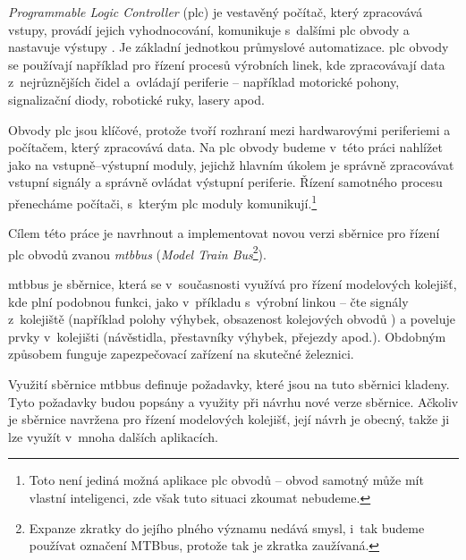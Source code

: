 \textit{Programmable Logic Controller} (\gls{plc}) je vestavěný počítač,
který zpracovává vstupy, provádí jejich vyhodnocování, komunikuje s~dalšími
\gls{plc} obvody a nastavuje výstupy \cite{plc:web}. Je základní jednotkou průmyslové
automatizace. \gls{plc} obvody se používají například pro řízení procesů
výrobních linek, kde zpracovávají data z~nejrůznějších čidel a~ovládají
periferie – například motorické pohony, signalizační diody, robotické ruky,
lasery apod.

Obvody \gls{plc} jsou klíčové, protože tvoří rozhraní mezi hardwarovými
periferiemi a počítačem, který zpracovává data. Na
\gls{plc} obvody budeme v~této práci nahlížet jako na vstupně–výstupní moduly,
jejichž hlavním úkolem je správně zpracovávat vstupní signály a správně ovládat
výstupní periferie. Řízení samotného procesu přenecháme počítači, s~kterým
\gls{plc} moduly komunikují.\footnote{Toto není jediná možná aplikace \gls{plc}
obvodů – obvod samotný může mít vlastní inteligenci, zde však tuto situaci
zkoumat nebudeme.}

Cílem této práce je navrhnout a implementovat novou verzi sběrnice pro řízení
\gls{plc} obvodů zvanou \textit{\gls{mtbbus}} (\textit{Model Train
Bus}\footnote{Expanze zkratky do jejího plného významu nedává smysl, i~tak
budeme používat označení MTBbus, protože tak je zkratka zaužívaná.}).

\gls{mtbbus} je sběrnice, která se v~současnosti využívá pro řízení modelových
kolejišť, kde plní podobnou funkci, jako v~příkladu s~výrobní linkou – čte
signály z~kolejiště (například polohy výhybek, obsazenost kolejových obvodů
\cite{ko:web}) a poveluje prvky v~kolejišti (návěstidla, přestavníky výhybek,
přejezdy apod.). Obdobným způsobem funguje zapezpečovací zařízení na skutečné
železnici.

Využití sběrnice \gls{mtbbus} definuje požadavky, které jsou na tuto sběrnici
kladeny. Tyto požadavky budou popsány a využity při návrhu nové verze sběrnice.
Ačkoliv je sběrnice navržena pro řízení modelových kolejišť, její návrh je
obecný, takže ji lze využít v~mnoha dalších aplikacích.
